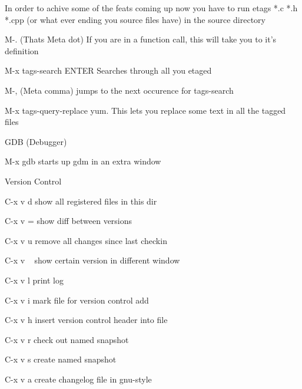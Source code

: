 \documentclass{article}
\begin{document}
In order to achive some of the feats coming up now you have to run etags *.c *.h *.cpp (or what ever ending you source files have) in the source directory


M-. (Thats Meta dot) If you are in a function call, this will take you to it's definition 


M-x tags-search ENTER Searches through all you etaged 


M-, (Meta comma) jumps to the next occurence for tags-search 


M-x tags-query-replace yum. This lets you replace some text in all the tagged files 




GDB (Debugger)


M-x gdb starts up gdm in an extra window



Version Control


C-x v d show all registered files in this dir


C-x v = show diff between versions


C-x v u remove all changes since last checkin


C-x v ~ show certain version in different window


C-x v l print log


C-x v i mark file for version control add


C-x v h insert version control header into file


C-x v r check out named snapshot


C-x v s create named snapshot


C-x v a create changelog file in gnu-style
\end{document}
